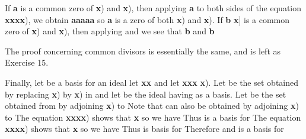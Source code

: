 \documentclass[11pt,oneside]{article}
\begin{document}
\begin{BookBody}
 If\textbf{ a}  is a common zero of \textbf{x}) and \textbf{x}), then applying \BookInline{\phi }\enspace\textbf{a} to both sides of the equation \textbf{x}\textbf{x}\textbf{x}\textbf{x}), we obtain \enspace\textbf{a}\enspace\textbf{a}\enspace\textbf{a}\enspace\textbf{a}\enspace\textbf{a} so \textbf{a} is a zero of both \textbf{x}) and \textbf{x}). If\textbf{ b} \BookInline{\in F[}\textbf{x}] is a common zero of \textbf{x}) and \textbf{x}), then applying \BookInline{\phi }  and we see that \enspace\textbf{b} and \enspace\textbf{b}

The proof concerning common divisors is essentially the same, and is left as Exercise 15.

Finally, let  be a basis for an ideal  let \textbf{x}\textbf{x} and let \textbf{x}\textbf{x}\textbf{x}\BookInline{)\; + } \textbf{x}). Let  be the set obtained by replacing \textbf{x}) by \textbf{x}) in  and let  be the ideal having  as a basis. Let  be the set obtained from  by adjoining \textbf{x}) to  Note that  can also be obtained by adjoining \textbf{x}) to  The equation \textbf{x}\textbf{x}\textbf{x}\textbf{x}) shows that \textbf{x} so we have  Thus  is a basis for  The equation \textbf{x}\textbf{x}\textbf{x}\textbf{x}) shows that \textbf{x} so we have  Thus  is basis for  Therefore  and  is a basis for \BookEnd{\blacklozenge}


\end{BookBody}
\end{document}
